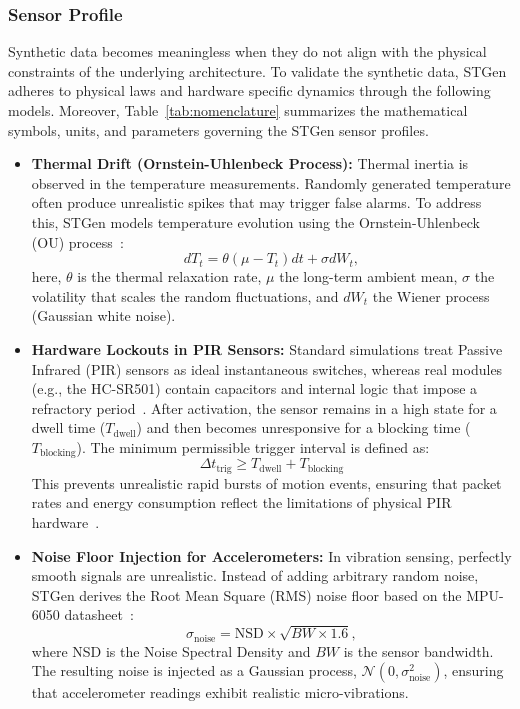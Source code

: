 \documentclass[jsan,article,submit,moreauthors,pdftex]{Definitions/mdpi}
\begin{document}
\subsubsection{Sensor Profile}
\label{sensor-profile}
Synthetic data becomes meaningless when they do not align with the physical constraints of the underlying architecture. To validate the synthetic data, STGen adheres to physical laws and hardware specific dynamics through the following models. Moreover, Table~\ref{tab:nomenclature} summarizes the mathematical symbols, units, and parameters governing the STGen sensor profiles.


\begin{itemize}
    \item \textbf{Thermal Drift (Ornstein-Uhlenbeck Process):} 
    Thermal inertia is observed in the temperature measurements. Randomly generated temperature often produce unrealistic spikes that may trigger false alarms. To address this, STGen models temperature evolution using the Ornstein-Uhlenbeck (OU) process~\cite{uhlenbeck1930}:
    \begin{equation}
    dT_t = \theta(\mu - T_t)dt + \sigma dW_t,
    \end{equation}
    here, $\theta$ is the thermal relaxation rate, $\mu$ the long-term ambient mean, $\sigma$ the volatility that scales the random fluctuations, and $dW_t$ the Wiener process (Gaussian white noise).

    \item \textbf{Hardware Lockouts in PIR Sensors:} 
    Standard simulations treat Passive Infrared (PIR) sensors as ideal instantaneous switches, whereas real modules (e.g., the HC-SR501) contain capacitors and internal logic that impose a refractory period~\cite{hcsr501}. After activation, the sensor remains in a high state for a dwell time ($T_{\text{dwell}}$) and then becomes unresponsive for a blocking time ($T_{\text{blocking}}$). The minimum permissible trigger interval is defined as:
    \begin{equation}
    \Delta t_{\text{trig}} \ge T_{\text{dwell}} + T_{\text{blocking}}
    \end{equation}
    This prevents unrealistic rapid bursts of motion events, ensuring that packet rates and energy consumption reflect the limitations of physical PIR hardware~\cite{shaikh2016energy}.
    
    \item \textbf{Noise Floor Injection for Accelerometers:}      
    In vibration sensing, perfectly smooth signals are unrealistic. Instead of adding arbitrary random noise, STGen derives the Root Mean Square (RMS) noise floor based on the MPU-6050 datasheet~\cite{mpu6050}:
    \begin{equation}
    \sigma_{\text{noise}} = \text{NSD} \times \sqrt{BW \times 1.6},
    \end{equation}
    where NSD is the Noise Spectral Density and $BW$ is the sensor bandwidth. The resulting noise is injected as a Gaussian process, $\mathcal{N}(0, \sigma_{\text{noise}}^2)$, ensuring that accelerometer readings exhibit realistic micro-vibrations.
    

\end{itemize}
\end{document}
